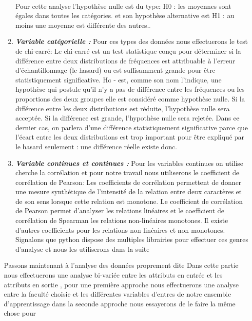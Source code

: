 \begin{enumerate}
	\paragraph{}
	Pour cette analyse l'hypothèse nulle est du type:
	H0 : les moyennes sont égales dans toutes les catégories. 
	et son hypothèse alternative est
	H1 : au moins une moyenne est différente des autres..
	\item \emph{\textbf{Variable catégorielle   :}} 
	Pour ces types des données nous effectuerons le test de chi-carré: Le chi-carré est un test statistique conçu pour déterminer si la différence
	entre deux distributions de fréquences est attribuable à l'erreur
	d'échantillonnage (le hasard) ou est suffisamment grande pour être
	statistiquement significative.
	Ho - est, comme son nom l'indique, une hypothèse qui postule qu'il n'y a pas de différence entre les fréquences ou les proportions des deux groupes elle est considéré comme hypothèse nulle.
	Si la différence entre les deux distributions est réduite, l'hypothèse
	nulle sera acceptée. Si la différence est grande, l'hypothèse nulle sera
	rejetée. Dans ce dernier cas, on parlera d'une différence
	statistiquement significative parce que l'écart entre les deux
	distributions est trop important pour être expliqué par le hasard
	seulement : une différence réelle existe donc.
\item \emph{\textbf{Variable continues et continues  :}} 
Pour les variables continues on utilise cherche la corrélation et pour
notre travail nous utiliserons le coefficient de corrélation de
Pearson: Les coefficients de corrélation permettent de donner une mesure
synthétique de l'intensité de la relation entre deux caractères et de
son sens lorsque cette relation est monotone. Le coefficient de
corrélation de Pearson permet d'analyser les relations linéaires et le
coefficient de corrélation de Spearman les relations non-linéaires
monotones. Il existe d'autres coefficients pour les relations
non-linéaires et non-monotones.
Signalons que python dispose des multiples librairies pour effectuer ces
genres d'analyse et nous les utiliserons dans la suite
\end{enumerate}
Passons maintenant à l'analyse  des données proprement dite 
 Dans cette partie nous effectuerons une analyse bi-variée
 entre les attributs en entrée et les attributs en sortie , pour une
 première approche nous effectuerons une analyse entre la faculté choisie
 et les différentes variables d'entres de notre ensemble d'apprentissage
 dans la seconde approche nous essayerons de le faire la même chose pour
